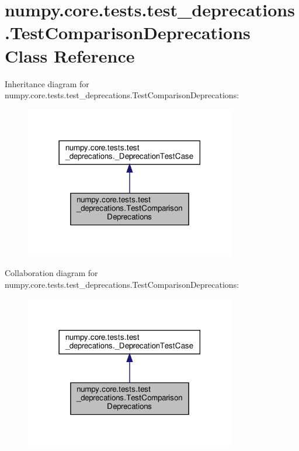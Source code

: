 \hypertarget{classnumpy_1_1core_1_1tests_1_1test__deprecations_1_1TestComparisonDeprecations}{}\section{numpy.\+core.\+tests.\+test\+\_\+deprecations.\+Test\+Comparison\+Deprecations Class Reference}
\label{classnumpy_1_1core_1_1tests_1_1test__deprecations_1_1TestComparisonDeprecations}


Inheritance diagram for numpy.\+core.\+tests.\+test\+\_\+deprecations.\+Test\+Comparison\+Deprecations\+:
\nopagebreak
\begin{figure}[H]
\begin{center}
\leavevmode
\includegraphics[width=261pt]{classnumpy_1_1core_1_1tests_1_1test__deprecations_1_1TestComparisonDeprecations__inherit__graph}
\end{center}
\end{figure}


Collaboration diagram for numpy.\+core.\+tests.\+test\+\_\+deprecations.\+Test\+Comparison\+Deprecations\+:
\nopagebreak
\begin{figure}[H]
\begin{center}
\leavevmode
\includegraphics[width=261pt]{classnumpy_1_1core_1_1tests_1_1test__deprecations_1_1TestComparisonDeprecations__coll__graph}
\end{center}
\end{figure}
